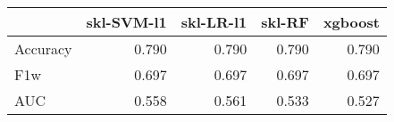 \begin{tabular}{lrrrr}
\toprule
{} &  skl-SVM-l1 &  skl-LR-l1 &  skl-RF &  xgboost \\
\midrule
Accuracy &       0.790 &      0.790 &   0.790 &    0.790 \\
F1w      &       0.697 &      0.697 &   0.697 &    0.697 \\
AUC      &       0.558 &      0.561 &   0.533 &    0.527 \\
\bottomrule
\end{tabular}
